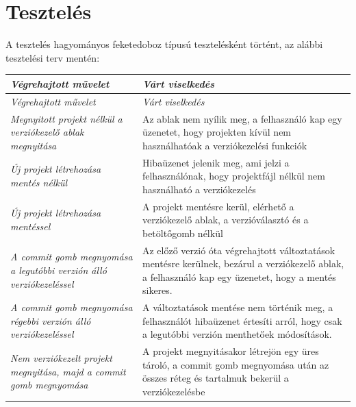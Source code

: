 \section{Tesztelés}
A tesztelés hagyományos feketedoboz típusú tesztelésként történt, az alábbi tesztelési terv mentén:
\begin{center}
	\begin{longtable}{ | p{} | p{} | }
		
		\hline
		\emph{Végrehajtott művelet} & \emph{Várt viselkedés}
		\\ \hline \hline
		\endfirsthead %
		
		\hline
		\emph{Végrehajtott művelet} & \emph{Várt viselkedés}
		\\ \hline \hline
		\endhead %
		
		
		\emph{Megnyitott projekt nélkül a verziókezelő ablak megnyitása}
		& Az ablak nem nyílik meg, a felhasználó kap egy üzenetet, hogy projekten kívül nem használhatóak a verziókezelési funkciók
		\\ \hline
		
		\emph{Új projekt létrehozása mentés nélkül}
		& Hibaüzenet jelenik meg, ami jelzi a felhasználónak, hogy projektfájl nélkül nem használható a verziókezelés
		\\ \hline
		
		\emph{Új projekt létrehozása mentéssel}
		& A projekt mentésre kerül, elérhető a verziókezelő ablak, a verzióválasztó és a betöltőgomb nélkül
		\\ \hline
		
		\emph{A commit gomb megnyomása a legutóbbi verzión álló verziókezeléssel}
		& Az előző verzió óta végrehajtott változtatások mentésre kerülnek, bezárul a verziókezelő ablak, a felhasználó kap egy üzenetet, hogy a mentés sikeres.
		\\ \hline
		
		\emph{A commit gomb megnyomása régebbi verzión álló verziókezeléssel}
		& A változtatások mentése nem történik meg, a felhasználót hibaüzenet értesíti arról, hogy csak a legutóbbi verzión menthetőek módosítások.
		\\ \hline
		
		\emph{Nem verziókezelt projekt megnyitása, majd a commit gomb megnyomása}
		& A projekt megnyitásakor létrejön egy üres tároló, a commit gomb megnyomása után az összes réteg és tartalmuk bekerül a verziókezelésbe
		\\ \hline
		

\end{longtable}
\end{center}
